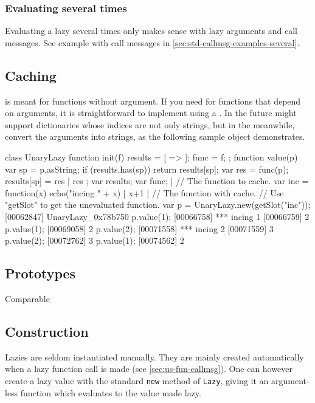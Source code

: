 \subsubsection{Evaluating several times}

Evaluating a lazy several times only makes sense with lazy arguments
and call messages. See example with call messages in
\autoref{sec:std-callmsg-examples-several}.


\subsection{Caching}

 is meant for functions without argument.  If you need
 for functions that depend on arguments, it is
straightforward to implement using a .  In the
future \us might support dictionaries whose indices are not only
strings, but in the meanwhile, convert the arguments into
strings, as the following sample object demonstrates.

\begin{urbiscript}
class UnaryLazy
{
  function init(f)
  {
    results = [ => ];
    func = f;
  };
  function value(p)
  {
    var sp = p.asString;
    if (results.has(sp))
      return results[sp];
    var res = func(p);
    results[sp] = res |
    res
  };
  var results;
  var func;
} |
// The function to cache.
var inc = function(x) { echo("incing " + x) | x+1 } |
// The function with cache.
// Use "getSlot" to get the unevaluated function.
var p = UnaryLazy.new(getSlot("inc"));
[00062847] UnaryLazy_0x78b750
p.value(1);
[00066758] *** incing 1
[00066759] 2
p.value(1);
[00069058] 2
p.value(2);
[00071558] *** incing 2
[00071559] 3
p.value(2);
[00072762] 3
p.value(1);
[00074562] 2
\end{urbiscript}

\subsection{Prototypes}

\begin{refObjects}
\item[Comparable]
\end{refObjects}

\subsection{Construction}

Lazies are seldom instantiated manually. They are mainly created
automatically when a lazy function call is made (see
\autoref{sec:us-fun-callmsg}). One can however create a lazy value
with the standard \lstinline|new| method of \lstinline|Lazy|, giving
it an argument-less function which evaluates to the value made lazy.

